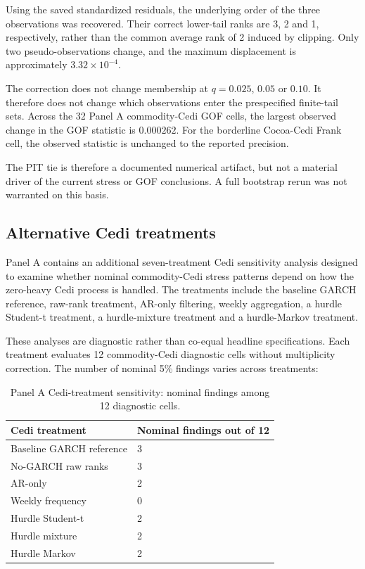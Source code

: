 Using the saved standardized residuals, the underlying order of the three observations was recovered. Their correct lower-tail ranks are 3, 2 and 1, respectively, rather than the common average rank of 2 induced by clipping. Only two pseudo-observations change, and the maximum displacement is approximately \(3.32\times10^{-4}\).

The correction does not change membership at \(q=0.025\), \(0.05\) or \(0.10\). It therefore does not change which observations enter the prespecified finite-tail sets. Across the 32 Panel A commodity-Cedi GOF cells, the largest observed change in the GOF statistic is \(0.000262\). For the borderline Cocoa-Cedi Frank cell, the observed statistic is unchanged to the reported precision.

The PIT tie is therefore a documented numerical artifact, but not a material driver of the current stress or GOF conclusions. A full bootstrap rerun was not warranted on this basis.

\subsection{Alternative Cedi treatments}

Panel A contains an additional seven-treatment Cedi sensitivity analysis designed to examine whether nominal commodity-Cedi stress patterns depend on how the zero-heavy Cedi process is handled. The treatments include the baseline GARCH reference, raw-rank treatment, AR-only filtering, weekly aggregation, a hurdle Student-t treatment, a hurdle-mixture treatment and a hurdle-Markov treatment.

These analyses are diagnostic rather than co-equal headline specifications. Each treatment evaluates 12 commodity-Cedi diagnostic cells without multiplicity correction. The number of nominal 5\% findings varies across treatments:

\begin{table}[htbp]
\centering
\caption{Panel A Cedi-treatment sensitivity: nominal findings among 12 diagnostic cells.}
\label{tab:cedi-treatments}
\small
\begin{tabularx}{\textwidth}{lX}
\toprule
\textbf{Cedi treatment} & \textbf{Nominal findings out of 12} \\
\midrule
Baseline GARCH reference & 3 \\
No-GARCH raw ranks & 3 \\
AR-only & 2 \\
Weekly frequency & 0 \\
Hurdle Student-t & 2 \\
Hurdle mixture & 2 \\
Hurdle Markov & 2 \\
\bottomrule
\end{tabularx}
\end{table}

